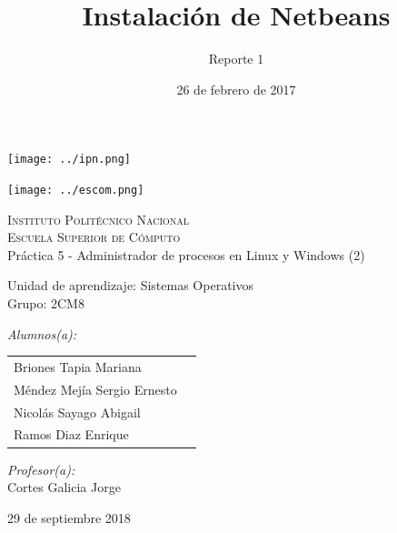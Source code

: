 \documentclass[12pt]{article}
\date{26 de febrero de 2017}
\title{Instalación de Netbeans}
\author{Reporte 1}
\begin{document}
		\begin{titlepage}
			\begin{center}
				
				
				\noindent
				\begin{minipage}{0.5\textwidth}
					\begin{flushleft} \large
						\texttt{[image: ../ipn.png]}
					\end{flushleft}
				\end{minipage}%
				\begin{minipage}{0.55\textwidth}
					\begin{flushright} \large
						\texttt{[image: ../escom.png]}
					\end{flushright}
				\end{minipage}
				
				\textsc{\LARGE Instituto Politécnico Nacional}\\[0.5cm]
				
				\textsc{\Large Escuela Superior de Cómputo}\\[1cm]
				
				
				{ \huge Práctica 5 - Administrador de procesos en Linux y Windows (2) \\[1cm] }
				
				{ \Large Unidad de aprendizaje: Sistemas Operativos} \\[1cm]
				
				{ \Large Grupo: 2CM8 } \\[1cm]
				
				\noindent
				\begin{minipage}{0.5\textwidth}
					\begin{flushleft} \large
						\emph{Alumnos(a):}\\
						
						\begin{tabular}{ll}
						 Briones Tapia Mariana \\
						 Méndez Mejía Sergio Ernesto \\
					     Nicolás Sayago Abigail\\
					     Ramos Diaz Enrique \\
					     
					\end{tabular}
					\end{flushleft}
				\end{minipage}%
				\begin{minipage}{0.5\textwidth}
					\begin{flushright} \large
						\emph{Profesor(a):} \\
						Cortes Galicia Jorge  \\
					\end{flushright}
				\end{minipage}
				
				\vfill
				
				{\large 29 de septiembre 2018}
			\end{center}
		\end{titlepage}
	
\end{document}
